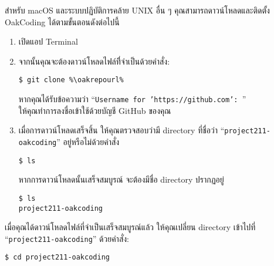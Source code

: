 \rule{0em}{1ex}

สำหรับ macOS และระบบปฏิบัติการคล้าย UNIX อื่น ๆ คุณสามารถดาวน์โหลด\linebreak[3] \mbox{และติดตั้ง} OakCoding ได้ตามขั้นตอนดังต่อไปนี้

\begin{enumerate}
\setlength{\itemsep}{0.7pt}
    \item เปิดแอป Terminal


    \item จากนั้นคุณจะต้องดาวน์โหลดไฟล์ทีี่จำเป็นด้วยคำสั่ง:

\begin{lstlisting}[numbers=none]
$ git clone %\oakrepourl%
\end{lstlisting}

    หากคุณได้รับข้อความว่า ``\texttt{Username for 'https://github.com': }''\\
    ให้คุณทำการลงชื่อเข้าใช้ด้วยบัญชี GitHub ของคุณ

    \item เมื่อการดาวน์โหลดเสร็จสิ้น ให้คุณตรวจสอบว่ามี directory ที่ชื่อว่า ``\mbox{\texttt{project211-oakcoding}}'' อยู่หรือไม่ด้วยคำสั่ง

\begin{lstlisting}[numbers=none]
$ ls
\end{lstlisting}

    หากการดาวน์โหลดนั้นเสร็จสมบูรณ์ จะต้องมีชื่อ directory ปรากฏอยู่

\begin{lstlisting}[numbers=none]
$ ls
project211-oakcoding
\end{lstlisting}
\end{enumerate}

เมื่อคุณได้ดาวน์โหลดไฟล์ที่จำเป็นเสร็จสมบูรณ์แล้ว ให้คุณเปลี่ยน directory เข้าไปที่ ``\texttt{project211-oakcoding}'' ด้วยคำสั่ง:

\begin{lstlisting}[numbers=none]
$ cd project211-oakcoding
\end{lstlisting}

